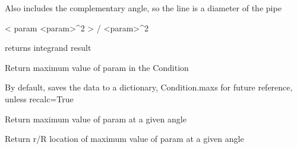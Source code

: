 \documentclass[letterpaper,10pt,english]{sphinxmanual}
\begin{document}
\begin{fulllineitems}
\begin{fulllineitems}
\sphinxAtStartPar
Also includes the complementary angle, so the line is a diameter of the pipe

\sphinxAtStartPar
\textless{} param \sphinxhyphen{} \textless{}param\textgreater{}\textasciicircum{}2 \textgreater{} / \textless{}param\textgreater{}\textasciicircum{}2

\sphinxAtStartPar
returns integrand result

\end{fulllineitems}


\begin{fulllineitems}
\label{\detokenize{api/MARIGOLD.Condition:MARIGOLD.Condition.max}}
\pysigstartsignatures
{}
\pysigstopsignatures
\sphinxAtStartPar
Return maximum value of param in the Condition

\sphinxAtStartPar
By default, saves the data to a dictionary, Condition.maxs
for future reference, unless recalc=True

\end{fulllineitems}


\begin{fulllineitems}
\label{\detokenize{api/MARIGOLD.Condition:MARIGOLD.Condition.max_line}}
\pysigstartsignatures
{}
\pysigstopsignatures
\sphinxAtStartPar
Return maximum value of param at a given angle

\end{fulllineitems}


\begin{fulllineitems}
\label{\detokenize{api/MARIGOLD.Condition:MARIGOLD.Condition.max_line_loc}}
\pysigstartsignatures
{}
\pysigstopsignatures
\sphinxAtStartPar
Return r/R location of maximum value of param at a given angle


\end{fulllineitems}
\end{fulllineitems}
\end{document}
